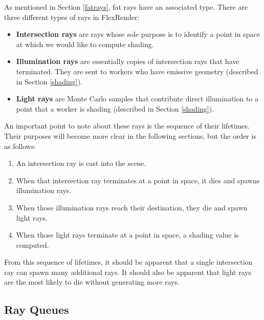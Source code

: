\documentclass[12pt]{ucthesis}
\newcommand{\captionfonts}{\small\bf\ssp}
\begin{document}
As mentioned in Section \ref{fatrays}, fat rays have an associated type. There
are three different types of rays in FlexRender:

\begin{itemize}
   \item \textbf{Intersection rays} are rays whose sole purpose is to identify
      a point in space at which we would like to compute shading.
   \item \textbf{Illumination rays} are essentially copies of intersection
      rays that have terminated. They are sent to workers who have emissive
      geometry (described in Section \ref{shading}).
   \item \textbf{Light rays} are Monte Carlo samples that contribute direct
      illumination to a point that a worker is shading (described in Section
      \ref{shading}).
\end{itemize}


An important point to note about these rays is the sequence of their lifetimes.
Their purposes will become more clear in the following sections, but the order
is as follows:

\begin{enumerate}
   \item An intersection ray is cast into the scene.
   \item When that intersection ray terminates at a point in space, it dies and
      spawns illumination rays.
   \item When those illumination rays reach their destination, they die and
      spawn light rays.
   \item When those light rays terminate at a point in space, a shading value
      is computed.
\end{enumerate}

From this sequence of lifetimes, it should be apparent that a single intersection
ray can spawn many additional rays. It should also be apparent that light rays
are the most likely to die without generating more rays.

\subsection {Ray Queues}
\label{queues}
\end{document}
